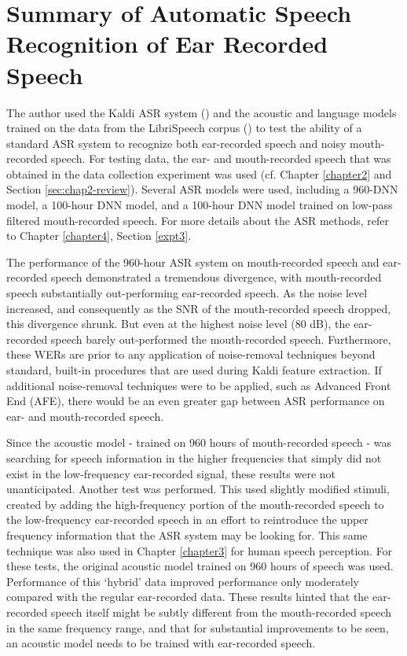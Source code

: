 \section{Summary of Automatic Speech Recognition of Ear Recorded Speech}\label{sec:chap4-review}

The author used the Kaldi ASR system (\cite{povey:11}) and the acoustic and language models trained on the data from the LibriSpeech corpus (\cite{panayotov:15}) to test the ability of a standard ASR system to recognize both ear-recorded speech and noisy mouth-recorded speech.  For testing data, the ear- and mouth-recorded speech that was obtained in the data collection experiment was used (cf. Chapter \ref{chapter2} and Section \ref{sec:chap2-review}). Several ASR models were used, including a 960-DNN model, a 100-hour DNN model, and a 100-hour DNN model trained on low-pass filtered mouth-recorded speech.  For more details about the ASR methods, refer to Chapter \ref{chapter4}, Section \ref{expt3}.

The performance of the 960-hour ASR system on mouth-recorded speech and ear-recorded speech demonstrated a tremendous divergence, with mouth-recorded speech substantially out-performing ear-recorded speech.  As the noise level increased, and consequently as the SNR of the mouth-recorded speech dropped, this divergence shrunk.  But even at the highest noise level (80 dB), the ear-recorded speech barely out-performed the mouth-recorded speech.  Furthermore, these WERs are prior to any application of noise-removal techniques beyond standard, built-in procedures that are used during Kaldi feature extraction.  If additional noise-removal techniques were to be applied, such as Advanced Front End (AFE), there would be an even greater gap between ASR performance on ear- and mouth-recorded speech.

Since the acoustic model - trained on 960 hours of mouth-recorded speech - was searching for speech information in the higher frequencies that simply did not exist in the low-frequency ear-recorded signal, these results were not unanticipated.  Another test was performed. This used slightly modified stimuli, created by adding the high-frequency portion of the mouth-recorded speech to the low-frequency ear-recorded speech in an effort to reintroduce the upper frequency information that the ASR system may be looking for.  This same technique was also used in Chapter \ref{chapter3} for human speech perception.  For these tests, the original acoustic model trained on 960 hours of speech was used.  Performance of this `hybrid' data improved performance only moderately compared with the regular ear-recorded data.  These results hinted that the ear-recorded speech itself might be subtly different from the mouth-recorded speech in the same frequency range, and that for substantial improvements to be seen, an acoustic model needs to be trained with ear-recorded speech.

